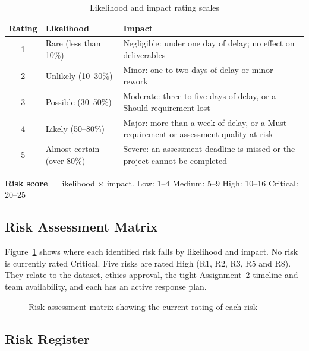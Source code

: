 \begin{table}[htbp]
\centering
\caption{Likelihood and impact rating scales}
\label{tab:risk-scales}
\begin{tabularx}{\textwidth}{@{}c >{\raggedright\arraybackslash}p{} >{\raggedright\arraybackslash}X@{}}
  \toprule
  \textbf{Rating} & \textbf{Likelihood} & \textbf{Impact} \\
  \midrule
  1 & Rare (less than 10\%) & Negligible: under one day of delay; no effect on deliverables \\
  2 & Unlikely (10--30\%) & Minor: one to two days of delay or minor rework \\
  3 & Possible (30--50\%) & Moderate: three to five days of delay, or a Should requirement lost \\
  4 & Likely (50--80\%) & Major: more than a week of delay, or a Must requirement or assessment quality at risk \\
  5 & Almost certain (over 80\%) & Severe: an assessment deadline is missed or the project cannot be completed \\
  \bottomrule
\end{tabularx}
\par\smallskip
{\footnotesize \textbf{Risk score} = likelihood $\times$ impact. \quad
\colorbox{risklow}{Low: 1--4} \enspace
\colorbox{riskmed}{Medium: 5--9} \enspace
\colorbox{riskhigh}{High: 10--16} \enspace
\colorbox{riskcrit}{Critical: 20--25}}
\end{table}

\subsection{Risk Assessment Matrix}\label{sec:risk-matrix}

Figure~\ref{fig:risk-matrix} shows where each identified risk falls by likelihood and impact. No risk is currently rated Critical. Five risks are rated High (R1, R2, R3, R5 and R8). They relate to the dataset, ethics approval, the tight Assignment~2 timeline and team availability, and each has an active response plan.

\begin{figure}[htbp]
\centering

\caption{Risk assessment matrix showing the current rating of each risk}
\label{fig:risk-matrix}
\end{figure}

\subsection{Risk Register}\label{sec:risk-register}

